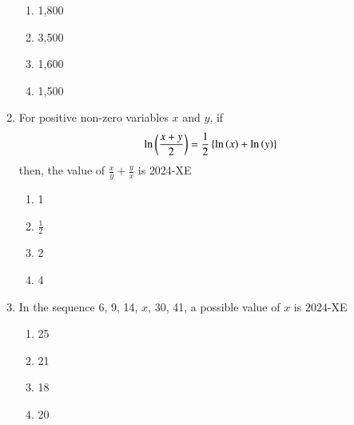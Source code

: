 \documentclass[journal,12pt,onecolumn]{IEEEtran}
\theoremstyle{remark}
\begin{document}
\begin{enumerate}
	\begin{enumerate}
		\item 1,800
		\item 3,500
		\item 1,600
		\item 1,500
	\end{enumerate}

\item For positive non-zero variables $x$ and $y$, if
	\begin{align*}
		\ln \left(\frac{x+y}{2}\right)=\frac{1}{2} \left\{\ln \left(x\right) + \ln \left(y\right)\right\}
	\end{align*}
then, the value of $\frac{x}{y} + \frac{y}{x}$ is
\hfill{2024-XE}

	\begin{enumerate}
		\item 1
		\item $\frac{1}{2}$
		\item 2
		\item 4
	\end{enumerate}
\item In the sequence 6, 9, 14, $x$, 30, 41, a possible value of $x$ is
\hfill{2024-XE}

	\begin{enumerate}
		\item 25
		\item 21
		\item 18
		\item 20
	\end{enumerate}

\end{enumerate}
\end{document}
